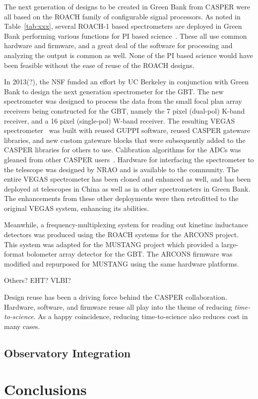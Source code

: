 \documentclass{ws-jai}
\begin{document}
The next generation of designs to be created in Green Bank from CASPER
were all based on the ROACH family of configurable signal processors.
As noted in Table~\ref{tab:xxx}, several ROACH-1 based spectrometers
are deployed in Green Bank performing various functions for PI based
science~\cite{ellingson, ghigo/heatherly,...}.  These all use common
hardware and firmware, and a great deal of the software for processing
and analyzing the output is common as well.  None of the PI based
science would have been feasible without the ease of reuse of the
ROACH designs.

In 2013(?), the NSF funded an effort by UC Berkeley in conjunction
with Green Bank to design the next generation spectrometer for the
GBT.  The new spectrometer was designed to process the data from the
small focal plan array receivers being constructed for the GBT, namely
the 7 pixel (dual-pol) K-band receiver, and a 16 pixel (single-pol)
W-band receiver.  The resulting VEGAS
spectrometer~\cite{chennamengalam} was built with reused GUPPI
software, reused CASPER gateware libraries, and new custom gateware
blocks that were subsequently added to the CASPER libraries for others
to use.  Calibration algorithms for the ADCs was gleaned from other
CASPER users~\cite{Jack and Rurik}.  Hardware for interfacing the
spectrometer to the telescope was designed by NRAO and is available to
the community.  The entire VEGAS spectrometer has been cloned and
enhanced as well, and has been deployed at telescopes in China as well
as in other spectrometers in Green Bank.  The enhancements from these
other deployments were then retrofitted to the original VEGAS system,
enhancing its abilities.

Meanwhile, a frequency-multiplexing system for reading out kinetinc
inductance detectors was produced using the ROACH systems for the
ARCONS project.  This system was adapted for the MUSTANG project which
provided a large-format bolometer array detector for the GBT.  The
ARCONS firmware was modified and repurposed for MUSTANG using the same
hardware platforms. 

Others?  EHT? VLBI?

Design reuse has been a driving force behind the CASPER collaboration.
Hardware, software, and firmware reuse all play into the theme of
reducing \emph{time-to-science}.  As a happy coincidence, reducing
time-to-science also reduces cost in many cases.


\subsection{Observatory Integration}


\section{Conclusions} \label{sec:Conclusions}





\end{document}
